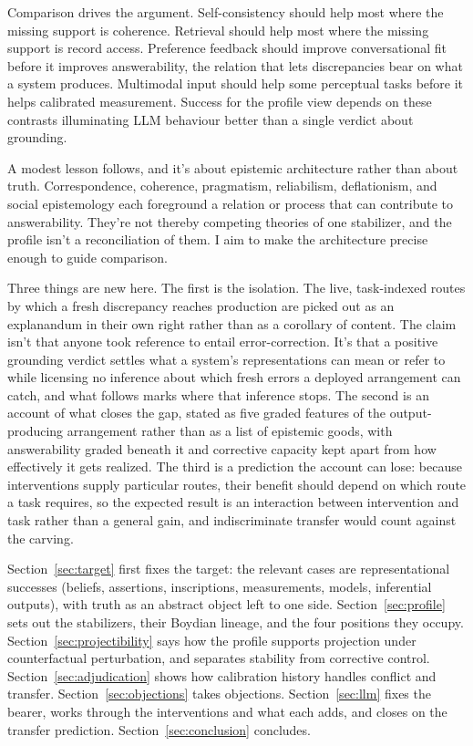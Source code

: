\documentclass[12pt]{article}
\begin{document}
Comparison drives the argument. Self-consistency should help most where the missing support
is coherence. Retrieval should help most where the missing support is record access.
Preference feedback should improve conversational fit before it improves answerability,
the relation that lets discrepancies bear on what a system produces.
Multimodal input should help some perceptual tasks before it helps calibrated measurement.
Success for the profile view depends on these contrasts illuminating LLM behaviour better than a single
verdict about grounding.

A modest lesson follows, and it's about epistemic architecture rather than about truth.
Correspondence, coherence, pragmatism, reliabilism, deflationism, and social epistemology
each foreground a relation or process that can contribute to answerability. They're not
thereby competing theories of one stabilizer, and the profile isn't a reconciliation of
them. I aim to make the architecture precise enough to guide comparison.

Three things are new here. The first is the isolation. The live, task-indexed routes by
which a fresh discrepancy reaches production are picked out as an explanandum in their own
right rather than as a corollary of content. The claim isn't that anyone took reference to
entail error-correction. It's that a positive grounding verdict settles what a system's
representations can mean or refer to while licensing no inference about which fresh errors a
deployed arrangement can catch, and what follows marks where that inference stops. The
second is an account of what closes the gap, stated as five graded features of the
output-producing arrangement rather than as a list of epistemic goods, with answerability
graded beneath it and corrective capacity kept apart from how effectively it gets realized.
The third is a prediction the account can lose: because
interventions supply particular routes, their benefit should depend on which route a task
requires, so the expected result is an interaction between intervention and task rather
than a general gain, and indiscriminate transfer would count against the carving.

Section~\ref{sec:target} first fixes the target: the relevant
cases are representational successes (beliefs, assertions, inscriptions, measurements,
models, inferential outputs), with truth as an abstract object left to one side.
Section~\ref{sec:profile}
sets out the stabilizers, their Boydian lineage, and the four positions they occupy.
Section~\ref{sec:projectibility} says how the profile supports projection under
counterfactual perturbation, and separates stability from corrective control.
Section~\ref{sec:adjudication} shows how calibration history handles conflict and
transfer. Section~\ref{sec:objections} takes objections.
Section~\ref{sec:llm} fixes the bearer, works through the interventions and what each
adds, and closes on the transfer prediction.
Section~\ref{sec:conclusion} concludes.
\end{document}
